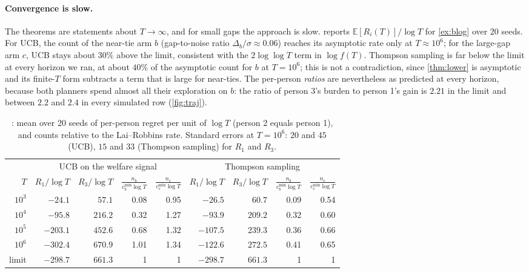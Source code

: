 \documentclass[11pt,a4paper]{article}
\theoremstyle{plain}
\theoremstyle{definition}
\theoremstyle{remark}
\newcommand{\E}{\mathbb{E}}
\newcommand{\cmin}{c^{\min}}
\begin{document}
\paragraph{Convergence is slow.} The theorems are statements about $T\to\infty$, and for small gaps the approach is slow.  reports $\E[R_i(T)]/\log T$ for \cref{ex:blog} over 20 seeds. For UCB, the count of the near-tie arm $b$ (gap-to-noise ratio $\Delta_b/\sigma\approx0.06$) reaches its asymptotic rate only at $T\approx10^6$; for the large-gap arm $c$, UCB stays about $30\%$ above the limit, consistent with the $2\log\log T$ term in $\log f(T)$. Thompson sampling is far below the limit at every horizon we ran, at about $40\%$ of the asymptotic count for $b$ at $T=10^6$; this is not a contradiction, since \cref{thm:lower} is asymptotic and its finite-$T$ form subtracts a term that is large for near-ties. The per-person \emph{ratios} are nevertheless as predicted at every horizon, because both planners spend almost all their exploration on $b$: the ratio of person 3's burden to person 1's gain is $2.21$ in the limit and between $2.2$ and $2.4$ in every simulated row (\cref{fig:traj}).

\begin{table}[h]\centering\small
\begin{tabular}{rrrrr|rrrr}
\toprule
& \multicolumn{4}{c|}{UCB on the welfare signal} & \multicolumn{4}{c}{Thompson sampling}\\
$T$ & $R_1/\log T$ & $R_3/\log T$ & $\frac{n_b}{\cmin_b\log T}$ & $\frac{n_c}{\cmin_c\log T}$ & $R_1/\log T$ & $R_3/\log T$ & $\frac{n_b}{\cmin_b\log T}$ & $\frac{n_c}{\cmin_c\log T}$\\
\midrule
$10^3$ & $-24.1$ & $57.1$ & 0.08 & 0.95 & $-26.5$ & $60.7$ & 0.09 & 0.54\\
$10^4$ & $-95.8$ & $216.2$ & 0.32 & 1.27 & $-93.9$ & $209.2$ & 0.32 & 0.60\\
$10^5$ & $-203.1$ & $452.6$ & 0.68 & 1.32 & $-107.5$ & $239.3$ & 0.36 & 0.66\\
$10^6$ & $-302.4$ & $670.9$ & 1.01 & 1.34 & $-122.6$ & $272.5$ & 0.41 & 0.65\\
\midrule
limit & $-298.7$ & $661.3$ & 1 & 1 & $-298.7$ & $661.3$ & 1 & 1\\
\bottomrule
\end{tabular}
\caption{: mean over 20 seeds of per-person regret per unit of $\log T$ (person 2 equals person 1), and counts relative to the Lai--Robbins rate. Standard errors at $T=10^6$: $20$ and $45$ (UCB), $15$ and $33$ (Thompson sampling) for $R_1$ and $R_3$.}
\label{tab:conv}
\end{table}
\end{document}
